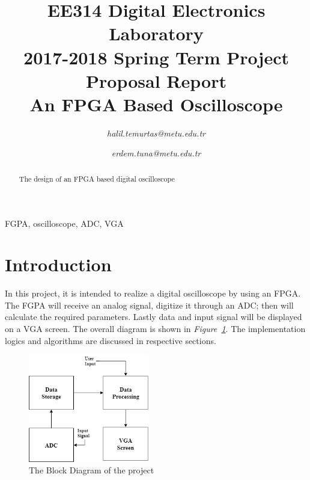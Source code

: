 \documentclass[paper]{IEEEtran}
\begin{document}
\title{EE314 Digital Electronics Laboratory\\
2017-2018 Spring Term Project Proposal Report\\
An FPGA Based Oscilloscope
}


\author{

\textit{halil.temurtas@metu.edu.tr}

\and

\textit{erdem.tuna@metu.edu.tr}


}

\maketitle

\begin{abstract}

The design of an FPGA based digital oscilloscope 

\end{abstract}

\begin{IEEEkeywords}
FGPA, oscilloscope, ADC, VGA
\end{IEEEkeywords}

\section{Introduction}
\- \indent
	In this project, it is intended to realize a digital oscilloscope by using an FPGA. The FGPA will receive an analog signal, digitize it through an ADC; then will calculate the required parameters. Lastly data and input signal will be displayed on a VGA screen. The overall diagram is shown in \textit{Figure~\ref{fig:overall_diagram}}. The implementation logics and algorithms are discussed in respective sections.

\begin{figure}[h!]
	\setlength{\unitlength}{\textwidth}
	\center 
	\includegraphics[width=0.47\textwidth]{overall_diagram}
	\caption{\label{fig:overall_diagram}The Block Diagram of the project}
\end{figure}
\end{document}

